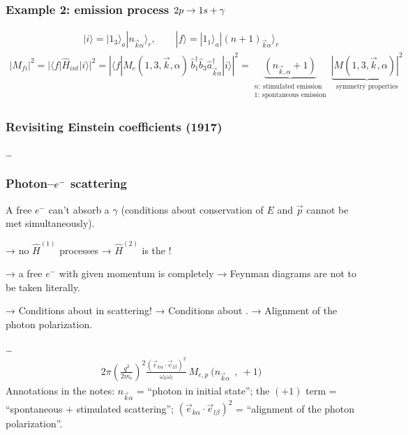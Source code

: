 \documentclass[letterpaper,10pt,english]{jupyterBook}
\begin{document}
\subsubsection*{Example 2: emission process \protect\(2p\to1s+\gamma\protect\)}
\begin{equation*}
\begin{split}
|i\rangle=|1_3\rangle_a|n_{\vec k\alpha}\rangle_r,\qquad|f\rangle=|1_1\rangle_a|(n+1)_{\vec k\alpha}\rangle_r
\end{split}
\end{equation*}\begin{equation*}
\begin{split}
|M_{fi}|^2=|\langle f|\hat H_{int}|i\rangle|^2=\left|\langle f|M_e(1,3,\vec k,\alpha)\,\hat b_1^\dagger\hat b_3\hat a^\dagger_{\vec k\alpha}|i\rangle\right|^2
=\underbrace{(n_{\vec k,\alpha}+1)}_{\substack{n:\ \text{stimulated emission}\\1:\ \text{spontaneous emission}}}\ \underbrace{|M(1,3,\vec k,\alpha)|^2}_{\text{symmetry properties}}
\end{split}
\end{equation*}\subsubsection*{Revisiting Einstein coefficients (1917)}

\sphinxAtStartPar
…
\subsubsection*{Photon–\protect\(e^-\protect\) scattering}

\sphinxAtStartPar
A free \(e^-\) can’t absorb a \(\gamma\) (conditions about conservation of \(E\) and \(\vec p\) cannot be met simultaneously).

\sphinxAtStartPar
→ no \(\hat H^{(1)}\) processes
→ \(\hat H^{(2)}\) is the !

\sphinxAtStartPar
→ a free \(e^-\) with given momentum is completely 
→ Feynman diagrams are not to be taken literally.

\sphinxAtStartPar
→ Conditions about  in scattering!
→ Conditions about .
→ Alignment of the photon polarization.

\sphinxAtStartPar
{} …
\begin{equation*}
\begin{split}
2\pi\left(\frac{q^2}{2m_e}\right)^2\frac{\left(\vec e_{k\alpha}\cdot\vec e_{l\beta}\right)^2}{\omega_k\omega_l}\ M_{e,p}\ \big(n_{\vec k\alpha}\ \ ,\ +1\big)
\end{split}
\end{equation*}
\sphinxAtStartPar
Annotations in the notes: \(n_{\vec k\alpha}\) = “photon in initial state”; the \((+1)\) term = “spontaneous + stimulated scattering”; \((\vec e_{k\alpha}\cdot\vec e_{l\beta})^2\) = “alignment of the photon polarization”.
\end{document}
